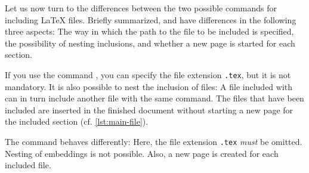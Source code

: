 Let us now turn to the differences between the two possible commands for including \LaTeX{} files. Briefly summarized, \texttt{} and \texttt{} have differences in the following three aspects: The way in which the path to the file to be included is specified, the possibility of nesting inclusions, and whether a new page is started for each section.

If you use the command \texttt{}, you can specify the file extension \texttt{.tex}, but it is not mandatory. It is also possible to nest the inclusion of files: A file included with \texttt{} can in turn include another file with the same command. The files that have been included are inserted in the finished document without starting a new page for the included section (cf. \cref{lst:main-file}).

The command \texttt{} behaves differently: Here, the file 
extension \texttt{.tex} \emph{must} be omitted. Nesting of embeddings is not 
possible. Also, a new page is created for each included file.